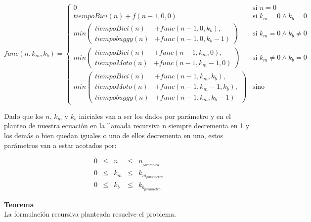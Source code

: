 \begin{equation*}
func(n, k_m, k_b) = 
\begin{cases} 
       0  & \mbox{si } n = 0  \\[2ex]
       tiempoBici(n) + f(n-1, 0, 0)  & \mbox{si } k_m=0 \wedge k_b=0 \\[2ex]
      min \left(
      \begin{split}
       tiempoBici(n) & + func(n-1, 0, k_b) , \\
       tiempobuggy(n) & + func(n-1, 0, k_b-1)
\end{split} \right) & \mbox{si } k_m=0 \wedge k_b\neq0 \\[3ex]
      min \left(
      \begin{split}
       tiempoBici(n) & + func(n-1, k_m, 0) , \\
       tiempoMoto(n) & + func(n-1, k_m-1, 0)
\end{split} \right) & \mbox{si } k_m\neq0 \wedge k_b=0 \\[3ex]
           min \left(
      \begin{split}
       tiempoBici(n) & + func(n-1, k_m, k_b) , \\
       tiempoMoto(n) & + func(n-1, k_m-1, k_b) , \\
       tiempobuggy(n) & + func(n-1, k_m, k_b-1)
\end{split} \right) & \mbox{sino}
\end{cases} 
\end{equation*}

Dado que los $n$, $k_m$ y $k_b$ iniciales van a ser los dados por par\'ametro y en el planteo de nuestra ecuaci\'on en la llamada recursiva n siempre decrementa en 1 y los dem\'as o bien quedan iguales o uno de ellos decrementa en uno, estos par\'ametros van a estar acotados por:

\begin{equation*}
\begin{array}{lllll}
0 & \leq & n &\leq & n_{_{parametro}} \\
0 & \leq & k_m & \leq & k_{m_{parametro}} \\
0 & \leq & k_b & \leq & k_{b_{parametro}}
\end{array}
\end{equation*}

\newpage

{\large\textbf{Teorema}}\\
La formulación recursiva planteada resuelve el problema.\\

